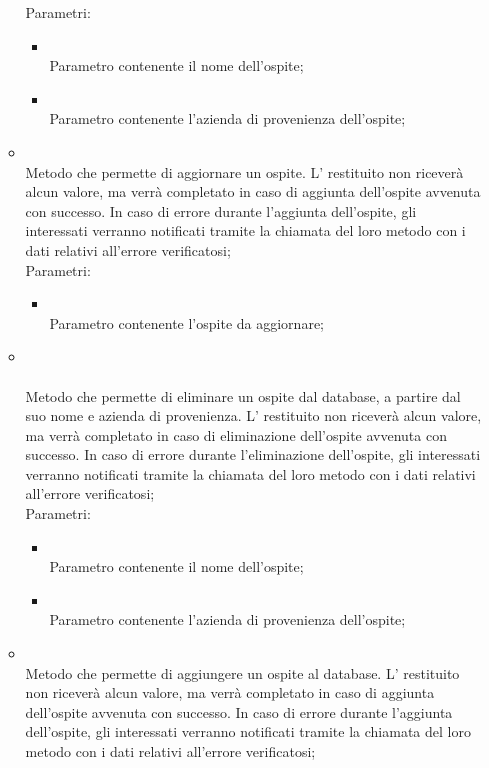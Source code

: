 \begin{itemize}
\begin{itemize}
		Parametri:
		\begin{itemize}
			\item {} \\
			Parametro contenente il nome dell'ospite;
			\item {} \\
			Parametro contenente l'azienda di provenienza dell'ospite;
		\end{itemize}
		\item[]  \\		Metodo che permette di aggiornare un ospite.  L' restituito non riceverà alcun valore, ma verrà completato in caso di aggiunta dell'ospite avvenuta con successo. In caso di errore durante l'aggiunta dell'ospite, gli  interessati verranno notificati tramite la chiamata del loro metodo  con i dati relativi all'errore verificatosi;\\
		Parametri:
		\begin{itemize}
			\item {} \\
			Parametro contenente l'ospite da aggiornare;
		\end{itemize}
		\item[]  \\\\		Metodo che permette di eliminare un ospite dal database, a partire dal suo nome e azienda di provenienza.  L' restituito non riceverà alcun valore, ma verrà completato in caso di eliminazione  dell'ospite avvenuta con successo. In caso di errore durante l'eliminazione dell'ospite, gli  interessati verranno notificati tramite la chiamata del loro metodo  con i dati relativi all'errore verificatosi;\\
		Parametri:
		\begin{itemize}
			\item {} \\
			Parametro contenente il nome dell'ospite;
			\item {} \\
			Parametro contenente l'azienda di provenienza dell'ospite;
		\end{itemize}
		\item[]  \\		Metodo che permette di aggiungere un ospite al database.  L' restituito non riceverà alcun valore, ma verrà completato in caso di aggiunta dell'ospite avvenuta con successo. In caso di errore durante l'aggiunta dell'ospite, gli  interessati verranno notificati tramite la chiamata del loro metodo  con i dati relativi all'errore verificatosi;\\

\end{itemize}
\end{itemize}
